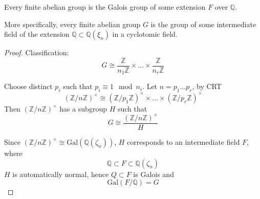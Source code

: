 \documentclass[openany]{book}
\newcommand{\Z}{\mathbb{Z}}
\newcommand{\Q}{\mathbb{Q}}
\newcommand{\gal}{\text{Gal}}
\begin{document}
\section{}
\begin{prop}
    Every finite abelian group is the Galois group of some extension $F$ over $\Q$. 

    More specifically, every finite abelian group $G$ is the group of some intermediate field of the extension $\Q\subset\Q(\xi_n)$ in a cyclotomic field.
\end{prop}
\begin{proof}
    Classification:
    \begin{equation*}
        G\cong\frac{\Z}{n_1\Z}\times\dots\times\frac{\Z}{n_r\Z}
    \end{equation*}

    Choose distinct $p_i$ such that $p_i\equiv 1\mod n_i$. Let $n=p_1\dots p_r$, by CRT 
    \begin{equation*}
        \left(\Z/n\Z\right)^\times\cong \left(\Z/p_1\Z\right)^\times\times\dots\times \left(\Z/p_r\Z\right)^\times
    \end{equation*}
    Then $\left(\Z/n\Z\right)^\times$ has a subgroup $H$ such that 
    \begin{equation*}
        G\cong\frac{\left(\Z/n\Z\right)^\times}{H}
    \end{equation*}
    

    Since $\left(\Z/n\Z\right)^\times\cong\gal(\Q(\zeta_n))$, $H$ corresponds to an intermediate field $F$, where 
    \begin{equation*}
        \Q\subset F\subset\Q(\zeta_n)
    \end{equation*}
    $H$ is automatically normal, hence $Q\subset F$ is Galois and 
    \begin{equation*}
        \gal(F/\Q)=G
    \end{equation*}
\end{proof}
\end{document}
